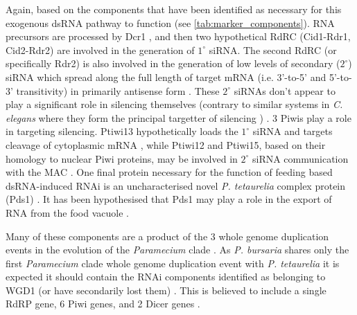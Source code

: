 Again, based on the components that have been identified as necessary
for this exogenous dsRNA pathway to function (see \cref{tab:marker_components}).  
RNA precursors are processed
by Dcr1 \citep{Lepere2009}, and then two hypothetical RdRC (Cid1-Rdr1, Cid2-Rdr2)
\citep{Marker2010,Marker2014} are involved in the generation of \(1^{\circ}\) 
siRNA.  
The second RdRC (or specifically Rdr2) is also involved in the generation
of low levels of secondary (\(2^{\circ}\)) siRNA which spread along the full length of
target mRNA (i.e. 3'-to-5' and 5'-to-3' transitivity) in primarily
antisense form \citep{Carradec2015}.  These \(2^{\circ}\) siRNAs don't
appear to play a significant role in silencing themselves (contrary to similar
systems in \textit{C. elegans} where they form the principal targetter of silencing 
\citep{Sijen2007,Pak2007}) \citep{Carradec2015}.
3 Piwis play a role in targeting silencing.  Ptiwi13 hypothetically
loads the \(1^{\circ}\) siRNA and targets cleavage of cytoplasmic mRNA \citep{Bouhouche2011},
while Ptiwi12 and Ptiwi15, based on their homology to nuclear Piwi proteins,
\citep{Marker2014,Carradec2015,Bouhouche2011} may be involved
in \(2^{\circ}\) siRNA communication with the MAC \citep{Carradec2015}.
One final protein necessary for the function of feeding based dsRNA-induced
RNAi is an uncharacterised novel \textit{P. tetaurelia} complex protein (Pds1) \citep{Marker2014}.
It has been hypothesised that Pds1 may play a role in the export of RNA from 
the food vacuole \citep{Carradec2015}.


Many of these components are a product of the 3 whole genome duplication
events in the evolution of the \textit{Paramecium} clade \citep{McGrath2014}.
As \textit{P. bursaria} shares only the first \textit{Paramecium} clade whole
genome duplication event with \textit{P. tetaurelia} it is expected
it should contain the RNAi components identified as belonging to WGD1 (or have 
secondarily lost them) \citep{McGrath2014}.
This is believed to include a single RdRP gene, 6 Piwi genes, and 2 Dicer genes \citep{Marker2014}.



